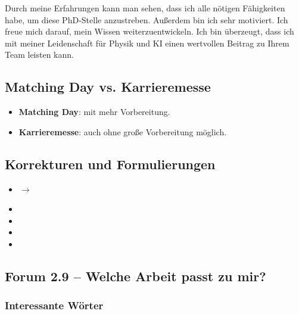 Durch meine Erfahrungen kann man sehen, dass ich alle nötigen Fähigkeiten habe, um diese PhD-Stelle anzustreben. Außerdem bin ich sehr motiviert. Ich freue mich darauf, mein Wissen weiterzuentwickeln. Ich bin überzeugt, dass ich mit meiner Leidenschaft für Physik und KI einen wertvollen Beitrag zu Ihrem Team leisten kann.

\subsection{Matching Day vs. Karrieremesse}

\begin{itemize}
    \item \textbf{Matching Day}: mit mehr Vorbereitung.
    \item \textbf{Karrieremesse}: auch ohne große Vorbereitung möglich.
\end{itemize}

\subsection{Korrekturen und Formulierungen}

\begin{itemize}
    \item {} $\rightarrow$ 
    \item {}
    \item {}
    \item {}
    \item {}
\end{itemize}

\subsection{Forum 2.9 -- Welche Arbeit passt zu mir?}

\subsubsection{Interessante Wörter}

\begin{vocabtable}
\end{vocabtable}

